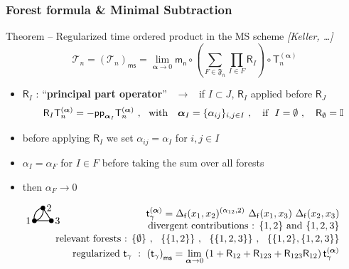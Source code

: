 \documentclass[9pt]{beamer}
\newcommand{\alphabd}{\boldsymbol{\alpha}}
\newcommand{\ms}{\mathsf{ms}}
\newcommand{\pp}{\mathsf{pp}}
\newcommand{\citebeam}[1]{\textit{\textcolor{black!60!white}{[#1]}}}
\newcommand{\Tcal}{\mathcal{T}}
\newcommand{\Ibb}{\mathbb{I}}
\newcommand{\Frak}{\mathfrak{F}}
\newcommand{\Rsf}{\mathsf{R}}
\newcommand{\Tsf}{\mathsf{T}}
\newcommand{\fsf}{\mathsf{f}}
\newcommand{\msf}{\mathsf{m}}
\newcommand{\nsf}{\mathsf{n}}
\newcommand{\tsf}{\mathsf{t}}
\newcommand{\FtwoGoneHoneF}{\begin{tikzpicture}[thick,scale=1.5]
\useasboundingbox (-0.1,0.1) rectangle (0.5,0.4);
\filldraw (0,0) circle (1.3pt) node[left] {$1$};
\filldraw (0.4,0) circle (1.3pt) node[right] {$3$};
\filldraw (0.2,0.3) circle (1.3pt) node[right] {$2$};
\draw (0,0) edge [out=105,in=185] node[above] {} (0.2,0.3);
\draw (0,0) edge [out=5,in=-75] node[above] {} (0.2,0.3);
\draw (0.4,0) -- (0.2,0.3);
\draw (0.4,0) -- (0,0);
\end{tikzpicture} }
\begin{document}

\begin{frame}[label=forest]

\frametitle{Forest formula \& Minimal Subtraction}

\vfill

\begin{block}{Theorem -- Regularized time ordered product in the MS scheme \hfill \citebeam{Keller, \dots}}
\vspace*{-12pt}
%
\begin{equation*}
\Tcal_n = \left(\Tcal_n\right)_\ms = \lim_{\alphabd \to 0} \msf_\nsf \circ \left( \sum_{F\in\Frak_{\overline{n}}} \prod_{I\in F} \Rsf_I \right) \circ \Tsf^{(\alphabd)}_n
\end{equation*}
%
\begin{itemize}
\setlength\itemsep{0pt}
\item $\Rsf_I$ : ``\textbf{principal part operator}'' \ $\to$ \ if $I\subset J$, $\Rsf_I$ applied before $\Rsf_J$
%
\vspace*{-7pt}
\begin{equation*}
\Rsf_I \Tsf^{(\alphabd)}_n = - \pp_{\alphabd_I} \Tsf^{(\alphabd)}_n \ , \ \mbox{ with } \ \ \alphabd_I = \{\alpha_{ij}\}_{i,j \in I} \ , \ \ \mbox{ if } \ I=\emptyset \ , \quad \Rsf_\emptyset = \Ibb
\vspace*{-8pt}
\end{equation*}
%
\item before applying $\Rsf_I$ we set $\alpha_{ij}=\alpha_I$ for $i,j\in I$ 
%
\item $\alpha_{I} = \alpha_F$ for $I \in F$ before taking the sum over all forests \hfill \hyperlink{details_forest}{}
%
\item then $\alpha_F \to 0$
\end{itemize}
%
\end{block}

\vspace*{-20pt}

\begin{eqnarray*}
\FtwoGoneHoneF \hspace*{-10pt}
&& \tsf_\gamma^{(\alphabd)} = \Delta_\fsf(x_1,x_2)^{(\alpha_{12},2)} \ \Delta_\fsf(x_1,x_3) \ \Delta_\fsf(x_2,x_3) \\[-4pt]
&& \mbox{divergent contributions : } \{1,2\} \ \mbox{and} \ \{1,2,3\} \\[-2pt]
&& \mbox{relevant forests : } \{\emptyset\} \ , \ \ \{\{1,2\}\} \ , \ \ \{\{1,2,3\}\} \ , \ \ \{\{1,2\},\{1,2,3\}\} \\[-2pt]
&& \mbox{regularized } \tsf_\gamma \ : \ \left(\tsf_\gamma\right)_\ms = 
\lim_{\alphabd \to 0} \left(1+\Rsf_{12}+\Rsf_{123}+\Rsf_{123}\Rsf_{12}\right) \tsf^{(\alphabd)}_\gamma
\end{eqnarray*}

\vfill

\end{frame}
\end{document}
